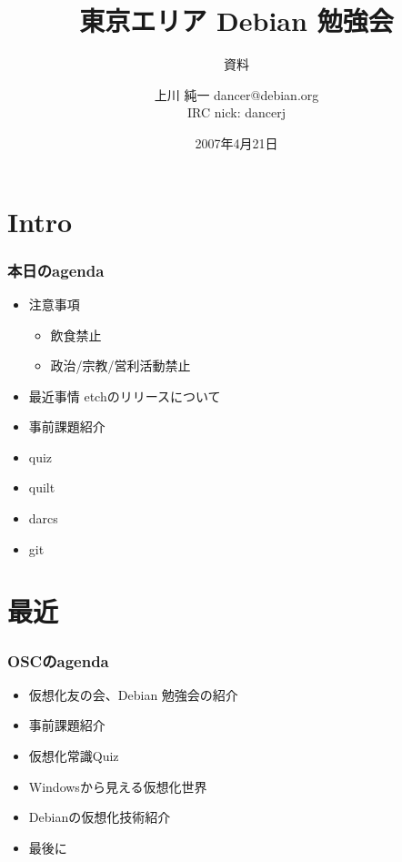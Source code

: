 \documentclass[cjk,dvipdfmx,12pt]{beamer}
\title{東京エリア Debian 勉強会}
\subtitle{資料}
\author{上川 純一 dancer@debian.org\\IRC nick: dancerj}
\date{2007年4月21日}
\begin{document}
\frame{\titlepage{}}

\section{Intro}

\begin{frame}
 \frametitle{本日のagenda}
\begin{minipage}[t]{0.4\hsize}
  \begin{itemize}
  \item 注意事項
	\begin{itemize}
	 \item 飲食禁止
	 \item 政治/宗教/営利活動禁止
	\end{itemize}
  \item 最近事情 etchのリリースについて
  \item 事前課題紹介
  \item quiz
 \end{itemize}
\end{minipage} 
\begin{minipage}[t]{0.4\hsize}
 \begin{itemize}
  \item quilt 
  \item darcs 
  \item git
 \end{itemize}
\end{minipage}
\end{frame}

\section{最近}

\begin{frame}
 \frametitle{OSCのagenda}
\begin{minipage}[t]{0.4\hsize}
  \begin{itemize}
   \item 仮想化友の会、Debian 勉強会の紹介
   \item 事前課題紹介
   \item 仮想化常識Quiz
 \end{itemize}
\end{minipage} 
\begin{minipage}[t]{0.4\hsize}
 \begin{itemize}
   \item Windowsから見える仮想化世界
   \item Debianの仮想化技術紹介
   \item 最後に
 \end{itemize}
\end{minipage}
\end{frame}
\end{document}
